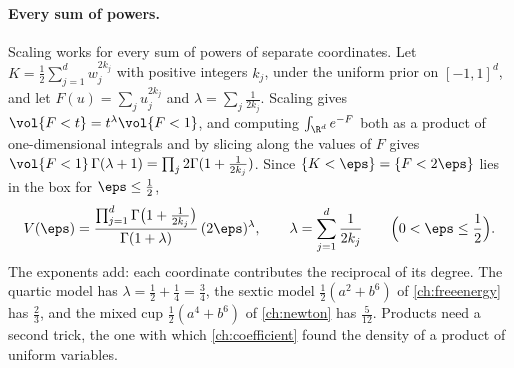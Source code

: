 \begin{refsection}
\paragraph{Every sum of powers.} Scaling works for every sum of powers of separate coordinates. Let $K=\frac12\sum_{j=1}^dw_j^{2k_j}$ with positive integers $k_j$, under the uniform prior on $[-1,1]^d$, and let $F(u)=\sum_ju_j^{2k_j}$ and $\lambda=\sum_j\frac1{2k_j}$. Scaling gives $\vol\{F<t\}=t^\lambda\vol\{F<1\}$, and computing $\int_{\R^d}e^{-F}$ both as a product of one-dimensional integrals and by slicing along the values of $F$ gives $\vol\{F<1\}\,\Gamma(\lambda+1)=\prod_j2\Gamma(1+\frac1{2k_j})$. Since $\{K<\eps\}=\{F<2\eps\}$ lies in the box for $\eps\le\frac12$,
\begin{equation}\label{eq:volume:sums}
V(\eps)=\frac{\prod_{j=1}^d\Gamma\bigl(1+\frac1{2k_j}\bigr)}{\Gamma(1+\lambda)}\,(2\eps)^{\lambda},\qquad\lambda=\sum_{j=1}^d\frac1{2k_j}\qquad\Bigl(0<\eps\le\frac12\Bigr).
\end{equation}
The exponents add: each coordinate contributes the reciprocal of its degree. The quartic model has $\lambda=\frac12+\frac14=\frac34$, the sextic model $\frac12(a^2+b^6)$ of \cref{ch:freeenergy} has $\frac23$, and the mixed cup $\frac12(a^4+b^6)$ of \cref{ch:newton} has $\frac5{12}$. Products need a second trick, the one with which \cref{ch:coefficient} found the density of a product of uniform variables.


\end{refsection}
